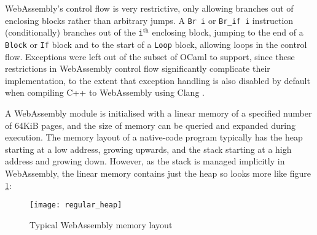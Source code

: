 WebAssembly's control flow is very restrictive, only allowing branches out of enclosing blocks rather than arbitrary jumps. A \verb|Br i| or \verb|Br_if i| instruction (conditionally) branches out of the \verb|i|$^{\text{th}}$ enclosing block, jumping to the end of a \verb|Block| or \verb|If| block and to the start of a \verb|Loop| block, allowing loops in the control flow.
Exceptions were left out of the subset of OCaml to support, since these restrictions in WebAssembly control flow significantly complicate their implementation, to the extent that exception handling is also disabled by default when compiling C++ to WebAssembly using Clang \cite{wasm-exceptions}.


A WebAssembly module is initialised with a linear memory of a specified number of 64KiB pages, and the size of memory can be queried and expanded during execution.
The memory layout of a native-code program typically has the heap starting at a low address, growing upwards, and the stack starting at a high address and growing down. However, as the stack is managed implicitly in WebAssembly, the linear memory contains just the heap so looks more like figure \ref{fig:wasm-heap}:


\begin{figure}[H]
\texttt{[image: regular\_heap]}
\caption{Typical WebAssembly memory layout}
\label{fig:wasm-heap}
\end{figure}


